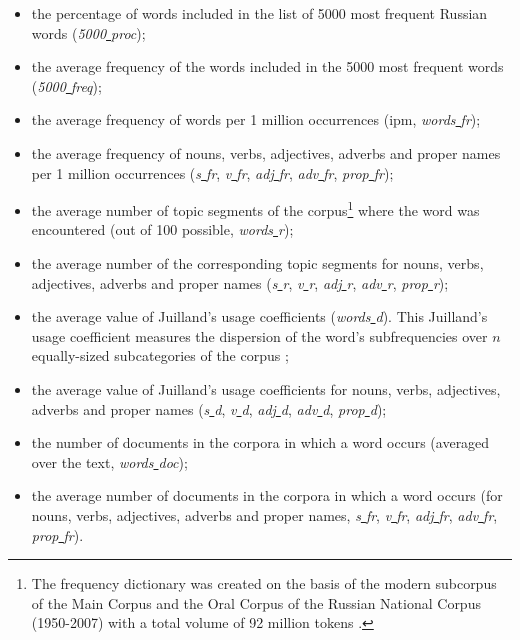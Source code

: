 \documentclass[runningheads]{llncs}
\begin{document}
\begin{enumerate}
    \begin{itemize}
        \item the percentage of words included in the list of 5000 most frequent Russian words (\textit{5000\underline{ }proc});
        \item the average frequency of the words included in the 5000 most frequent words (\textit{5000\underline{ }freq});
        \item the average frequency of words per 1 million occurrences (ipm, \textit{words\underline{ }fr});
        \item the average frequency of nouns, verbs, adjectives, adverbs and proper names per 1 million occurrences (\textit{s\underline{ }fr}, \textit{v\underline{ }fr}, \textit{adj\underline{ }fr}, \textit{adv\underline{ }fr}, \textit{prop\underline{ }fr});
        \item the average number of topic segments of the corpus\footnote{The frequency dictionary was created on the basis of the modern subcorpus of the Main Corpus and the Oral Corpus of the Russian National Corpus (1950-2007) \cite{RNC} with a total volume of 92 million tokens \cite{Lyashevskaya}.} where the word was encountered (out of 100 possible, \textit{words\underline{ }r});
        \item the average number of the corresponding topic segments for nouns, verbs, adjectives, adverbs and proper names (\textit{s\underline{ }r}, \textit{v\underline{ }r}, \textit{adj\underline{ }r}, \textit{adv\underline{ }r}, \textit{prop\underline{ }r});
        \item the average value of Juilland's usage coefficients (\textit{words\underline{ }d}). This Juilland's usage coefficient measures the dispersion of the word's subfrequencies over  $n$  equally-sized  subcategories of the corpus \cite{Juilland};
        \item the average value of Juilland's usage coefficients for nouns, verbs, adjectives, adverbs and proper names (\textit{s\underline{ }d}, \textit{v\underline{ }d}, \textit{adj\underline{ }d}, \textit{adv\underline{ }d}, \textit{prop\underline{ }d});
        \item the number of documents in the corpora in which a word occurs (averaged over the text, \textit{words\underline{ }doc});
        \item the average number of documents in the corpora in which a word occurs (for nouns, verbs, adjectives, adverbs and proper names, \textit{s\underline{ }fr}, \textit{v\underline{ }fr}, \textit{adj\underline{ }fr}, \textit{adv\underline{ }fr}, \textit{prop\underline{ }fr}).

\end{itemize}
\end{enumerate}
\end{document}
